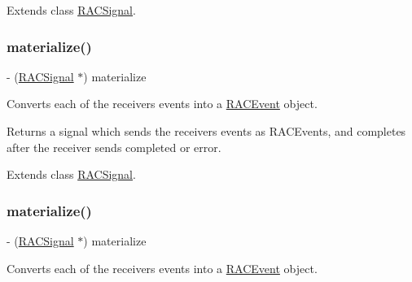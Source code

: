 Extends class \mbox{\hyperlink{interface_r_a_c_signal_a2b970ec1845b139478ba31f00fe34b71}{R\+A\+C\+Signal}}.

\mbox{\label{category_r_a_c_signal_07_operations_08_a2b970ec1845b139478ba31f00fe34b71}} 
\subsubsection{\texorpdfstring{materialize()}{materialize()}\hspace{0.1cm}{\footnotesize\ttfamily [2/3]}}
{\footnotesize\ttfamily -\/ (\mbox{\hyperlink{interface_r_a_c_signal}{R\+A\+C\+Signal}} $\ast$) materialize \begin{DoxyParamCaption}{ }\end{DoxyParamCaption}}

Converts each of the receiver\textquotesingle{}s events into a \mbox{\hyperlink{interface_r_a_c_event}{R\+A\+C\+Event}} object.

Returns a signal which sends the receiver\textquotesingle{}s events as R\+A\+C\+Events, and completes after the receiver sends {\ttfamily completed} or {\ttfamily error}. 

Extends class \mbox{\hyperlink{interface_r_a_c_signal_a2b970ec1845b139478ba31f00fe34b71}{R\+A\+C\+Signal}}.

\mbox{\label{category_r_a_c_signal_07_operations_08_a2b970ec1845b139478ba31f00fe34b71}} 
\subsubsection{\texorpdfstring{materialize()}{materialize()}\hspace{0.1cm}{\footnotesize\ttfamily [3/3]}}
{\footnotesize\ttfamily -\/ (\mbox{\hyperlink{interface_r_a_c_signal}{R\+A\+C\+Signal}} $\ast$) materialize \begin{DoxyParamCaption}{ }\end{DoxyParamCaption}}

Converts each of the receiver\textquotesingle{}s events into a \mbox{\hyperlink{interface_r_a_c_event}{R\+A\+C\+Event}} object.


